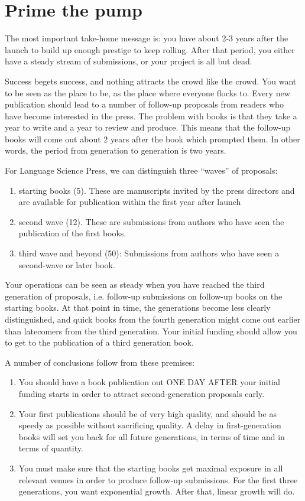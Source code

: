 \documentclass[guidelines,nonflat,modfonts] {langsci/langscibook}
\begin{document}
\chapter{Prime the pump}

The most important take-home message is: you have about 2-3 years after the launch to build up enough prestige to keep rolling. 
After that period, you either have a steady stream of submissions, or your project is all but dead. 

Success begets success, and nothing attracts the crowd like the crowd. You want to be seen as the place to be, as the place where everyone flocks to. Every new publication should lead to a number of follow-up proposals from readers who have become interested in the press. The problem with books is that they take a year to write and a year to review and produce. This means that the follow-up books will come out about 2 years after the book which prompted them. In other words, the period from generation to generation is two years. 

For Language Science Press, we can distinguish three ``waves'' of proposals: 

\begin{enumerate}
 \item starting books (5). These are manuscripts invited by the press directors and are available for publication within the first year after launch
 \item second wave (12). These are submissions from authors who have seen the publication of the first books.
 \item third wave and beyond (50): Submissions from authors who have seen a second-wave or later book. 
\end{enumerate}

Your operations can be seen as steady when you have reached the third generation of proposals, i.e. follow-up submissions on follow-up books on the starting books. At that point in time, the generations become less clearly distinguished, and quick books from the fourth generation might come out earlier than latecomers from the third generation. Your initial funding should allow you to get to the publication of a third generation book.

A number of conclusions follow from these premises:

\begin{enumerate}
 \item You should have a book publication out ONE DAY AFTER your initial funding starts in order to attract second-generation proposals early. 
 \item Your first publications should be of very high quality, and should be as speedy as possible without sacrificing quality. A delay in first-generation books will set you back for all future generations, in terms of time and in terms of quantity.
 \item You must make sure that the starting books get maximal exposure in all relevant venues in order to produce follow-up submissions. For the first three generations, you want exponential growth. After that, linear growth will do. 
\end{enumerate}
\end{document}
